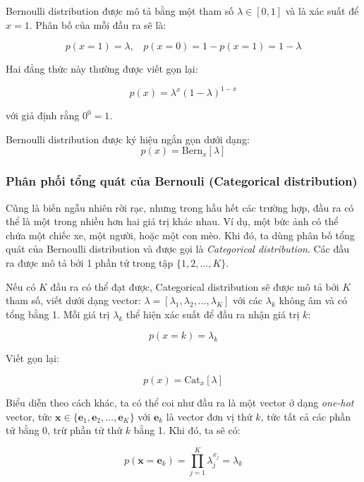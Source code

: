 \documentclass[../main-report.tex]{subfiles}
\begin{document}
Bernoulli distribution được mô tả bằng một tham số \(\lambda \in [0, 1]\) và là xác suất để \(x = 1\). Phân bố của mỗi đầu ra sẽ là:

\begin{equation}
p(x = 1) = \lambda, ~~~~ p(x = 0) = 1 - p(x = 1) = 1 - \lambda
\end{equation}

Hai đẳng thức này thường được viết gọn lại:

\begin{equation}
p(x) = \lambda^x (1 - \lambda)^{1 - x}
\end{equation}

với giả định rằng \(0 ^0 = 1\).

Bernoulli distribution được ký hiệu ngắn gọn dưới dạng:
\[
  p(x) = \text{Bern}_x [\lambda]
\]

\subsubsection*{Phân phối tổng quát của Bernouli (Categorical distribution)}
Cũng là biến ngẫu nhiên rời rạc, nhưng trong hầu hết các trường hợp, đầu ra có thể là một trong nhiều hơn hai giá trị khác nhau. Ví dụ, một bức ảnh có thể chứa một chiếc xe, một người, hoặc một con mèo. Khi đó, ta dùng phân bố tổng quát của Bernoulli distribution và được gọi là \emph{Categorical distribution}. Các đầu ra được mô tả bởi 1 phần tử trong tập \(\{1, 2, \dots, K\}\).

Nếu có \(K\) đầu ra có thể đạt được, Categorical distribution sẽ được mô tả bởi \(K\) tham số, viết dưới dạng vector: \(\lambda = [\lambda_1, \lambda_2, \dots, \lambda_K]\) với các \(\lambda_k\) không âm và có tổng bằng 1. Mỗi giá trị \(\lambda_k\) thể hiện xác suất để đầu ra nhận giá trị \(k\):

\[
  p(x = k) = \lambda_k
\]

Viết gọn lại:

\[
  p(x) = \text{Cat}_x [\lambda]
\]

Biểu diễn theo cách khác, ta có thể coi như đầu ra là một vector ở dạng \emph{one-hot} vector, tức \(\mathbf{x} \in \{\mathbf{e}_1, \mathbf{e}_2, \dots, \mathbf{e}_K\}\) với \(\mathbf{e}_k\) là vector đơn vị thứ \(k\), tức tất cả các phần tử bằng 0, trừ phần tử thứ \(k\) bằng 1. Khi đó, ta sẽ có:

\begin{equation}
p(\mathbf{x} = \mathbf{e}_k) = \prod_{j=1}^K \lambda_j^{x_j} = \lambda_k
\end{equation}
\end{document}
